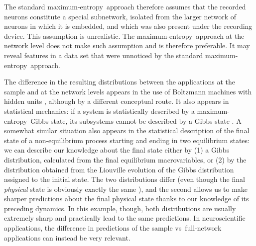 \documentclass[\ifafour a4paper,12pt,\else a5paper,10pt,\fi%
onecolumn,oneside,article,%
british%
]{memoir}
\theoremstyle{remark}
\theoremstyle{innote}
\newcommand*{\citep}{\parencites}
\renewcommand*{\|}{\nonscript\,\vert\nonscript\;\mathopen{}}
\newcommand*{\sect}{\S}%
\newcommand*{\vs}{{vs}}
\newcommand*{\me}{maximum-entropy}
\begin{document}
The standard \me\ approach therefore assumes that the recorded neurons
constitute a special subnetwork, isolated from the larger network of
neurons in which it is embedded, and which was also present under the
recording device. This assumption is unrealistic. The \me\ approach at the
network level does not make such assumption and is therefore preferable.
It may reveal features in a data set that were unnoticed by the standard
\me\ approach.



The difference in the resulting distributions between the applications at
the sample and at the network levels appears in the use of Boltzmann
machines with hidden units \citep{lerouxetal2008}, although by a different
conceptual route. It also appears in statistical mechanics: if a system is
statistically described by a \me\ Gibbs state, its subsystems cannot be
described by a Gibbs state \citep{maesetal1999}. A somewhat similar
situation also appears in the statistical description of the final state of
a non-equilibrium process starting and ending in two equilibrium states: we
can describe our knowledge about the final state either by (1) a Gibbs
distribution, calculated from the final equilibrium macrovariables, or (2)
by the distribution obtained from the Liouville evolution of the Gibbs
distribution assigned to the initial state. The two distributions differ
(even though the final \emph{physical} state is obviously exactly the same
\citep[\sect~4]{jaynes1985d_r1993}), and the second allows us to make
sharper predictions about the final physical state thanks to our knowledge
of its preceding dynamics. In this example, though, both distributions are
usually extremely sharp and practically lead to the same predictions. In
neuroscientific applications, the difference in predictions of the sample
\vs\ full-network applications can instead be very relevant.
\end{document}
